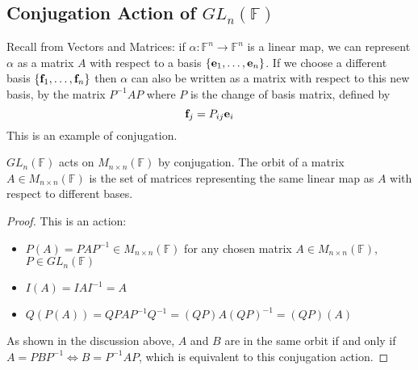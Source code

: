 \subsection{Conjugation Action of \(GL_n(\mathbb F)\)}
Recall from Vectors and Matrices: if \(\alpha\colon \mathbb F^n \to \mathbb F^n\) is a linear map, we can represent \(\alpha\) as a matrix \(A\) with respect to a basis \(\{ \vb e_1, \dots, \vb e_n \}\).
If we choose a different basis \(\{ \vb f_1, \dots, \vb f_n \}\) then \(\alpha\) can also be written as a matrix with respect to this new basis, by the matrix \(P^{-1}AP\) where \(P\) is the change of basis matrix, defined by
\[
	\vb f_j = P_{ij}\vb e_i
\]
This is an example of conjugation.
\begin{proposition}
	\(GL_n(\mathbb F)\) acts on \(M_{n \times n}(\mathbb F)\) by conjugation.
	The orbit of a matrix \(A \in M_{n \times n}(\mathbb F)\) is the set of matrices representing the same linear map as \(A\) with respect to different bases.
\end{proposition}
\begin{proof}
	This is an action:
	\begin{itemize}
		\item \(P(A) = PAP^{-1} \in M_{n \times n}(\mathbb F)\) for any chosen matrix \(A \in M_{n \times n}(\mathbb F)\), \(P \in GL_n(\mathbb F)\)
		\item \(I(A) = IAI^{-1} = A\)
		\item \(Q(P(A)) = QPAP^{-1}Q^{-1} = (QP)A(QP)^{-1} = (QP)(A)\)
	\end{itemize}
	As shown in the discussion above, \(A\) and \(B\) are in the same orbit if and only if \(A = PBP^{-1} \iff B = P^{-1}AP\), which is equivalent to this conjugation action.
\end{proof}

